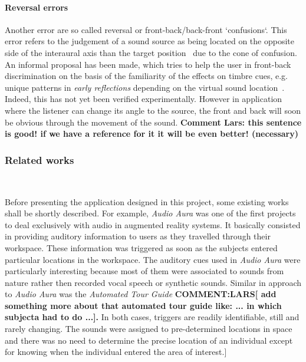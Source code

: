 \documentclass[journal]{IEEEtran}
\begin{document}
\paragraph{Reversal errors}
Another error are so called reversal or front-back/back-front `confusions`. This error refers to the judgement of a sound source as being located on the opposite side of the interaural axis than the target position~\cite{begault2001} due to the cone of confusion. An informal proposal has been made, which tries to help the user in front-back discrimination on the basis of the familiarity of the effects on timbre cues, e.g. unique patterns in \emph{early reflections} depending on the virtual sound location~\cite{begault1992}. Indeed, this has not yet been verified experimentally. However in application where the listener can change its angle to the source, the front and back will soon be obvious through the movement of the sound. \textbf{Comment Lars: this sentence is good! if we have a reference for it it will be even better! (necessary)}\\

\subsubsection*{Related works}~

Before presenting the application designed in this project, some existing works shall be shortly described. For example, \emph{Audio Aura} \cite{mynatt1997} was one of the first projects to deal exclusively with audio in augmented reality systems. It basically consisted in providing auditory information to users as they travelled through their workspace. These information was triggered as soon as the subjects entered particular locations in the workspace. The auditory cues used in \emph{Audio Aura} were particularly interesting because most of them were associated to sounds from nature rather then recorded vocal speech or synthetic sounds. Similar in approach to \emph{Audio Aura} was the \emph{Automated Tour Guide} \cite{bederson1995} \textbf{COMMENT:LARS[ add something more about that automated tour guide like: ... in which subjecta had to do ...].} In both cases, triggers are readily identifiable, still and rarely changing. The sounds were assigned to pre-determined locations in space and there was no need to determine the precise location of an individual except for knowing when the individual entered the area of interest.]
\end{document}
